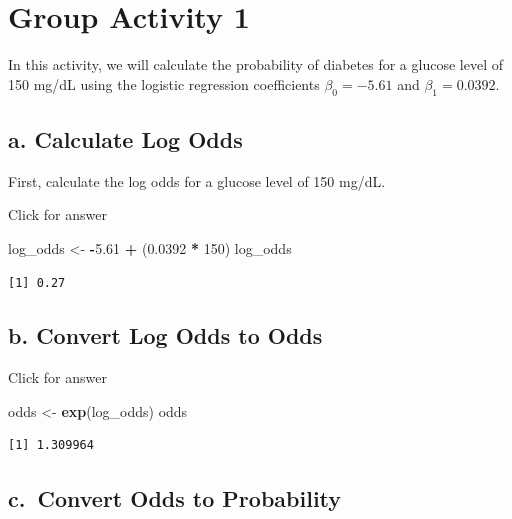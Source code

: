 \documentclass[
]{book}
\newenvironment{Shaded}{\begin{snugshade}}{\end{snugshade}}
\newcommand{\DecValTok}[1]{\textcolor[rgb]{0.00,0.00,0.81}{#1}}
\newcommand{\FloatTok}[1]{\textcolor[rgb]{0.00,0.00,0.81}{#1}}
\newcommand{\FunctionTok}[1]{\textcolor[rgb]{0.13,0.29,0.53}{\textbf{#1}}}
\newcommand{\NormalTok}[1]{#1}
\newcommand{\OtherTok}[1]{\textcolor[rgb]{0.56,0.35,0.01}{#1}}
\newcommand{\SpecialCharTok}[1]{\textcolor[rgb]{0.81,0.36,0.00}{\textbf{#1}}}
\begin{document}
\hypertarget{group-activity-1-9}{%
\section{Group Activity 1}\label{group-activity-1-9}}

In this activity, we will calculate the probability of diabetes for a glucose level of 150 mg/dL using the logistic regression coefficients \(\beta_0 = -5.61\) and \(\beta_1 = 0.0392\).

\hypertarget{a.-calculate-log-odds}{%
\subsection{a. Calculate Log Odds}\label{a.-calculate-log-odds}}

First, calculate the log odds for a glucose level of 150 mg/dL.

Click for answer

\begin{Shaded}
\begin{Highlighting}[]
\NormalTok{log\_odds }\OtherTok{\textless{}{-}} \SpecialCharTok{{-}}\FloatTok{5.61} \SpecialCharTok{+}\NormalTok{ (}\FloatTok{0.0392} \SpecialCharTok{*} \DecValTok{150}\NormalTok{)}
\NormalTok{log\_odds}
\end{Highlighting}
\end{Shaded}

\begin{verbatim}
[1] 0.27
\end{verbatim}

\hypertarget{b.-convert-log-odds-to-odds}{%
\subsection{b. Convert Log Odds to Odds}\label{b.-convert-log-odds-to-odds}}

Click for answer

\begin{Shaded}
\begin{Highlighting}[]
\NormalTok{odds }\OtherTok{\textless{}{-}} \FunctionTok{exp}\NormalTok{(log\_odds)}
\NormalTok{odds}
\end{Highlighting}
\end{Shaded}

\begin{verbatim}
[1] 1.309964
\end{verbatim}

\hypertarget{c.-convert-odds-to-probability}{%
\subsection{c.~Convert Odds to Probability}\label{c.-convert-odds-to-probability}}
\end{document}

